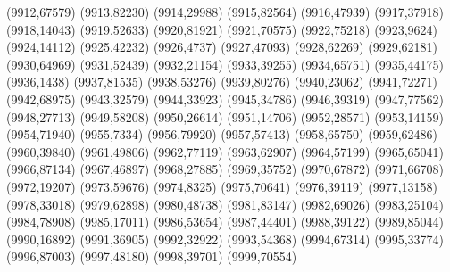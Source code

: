 (9912,67579)
(9913,82230)
(9914,29988)
(9915,82564)
(9916,47939)
(9917,37918)
(9918,14043)
(9919,52633)
(9920,81921)
(9921,70575)
(9922,75218)
(9923,9624)
(9924,14112)
(9925,42232)
(9926,4737)
(9927,47093)
(9928,62269)
(9929,62181)
(9930,64969)
(9931,52439)
(9932,21154)
(9933,39255)
(9934,65751)
(9935,44175)
(9936,1438)
(9937,81535)
(9938,53276)
(9939,80276)
(9940,23062)
(9941,72271)
(9942,68975)
(9943,32579)
(9944,33923)
(9945,34786)
(9946,39319)
(9947,77562)
(9948,27713)
(9949,58208)
(9950,26614)
(9951,14706)
(9952,28571)
(9953,14159)
(9954,71940)
(9955,7334)
(9956,79920)
(9957,57413)
(9958,65750)
(9959,62486)
(9960,39840)
(9961,49806)
(9962,77119)
(9963,62907)
(9964,57199)
(9965,65041)
(9966,87134)
(9967,46897)
(9968,27885)
(9969,35752)
(9970,67872)
(9971,66708)
(9972,19207)
(9973,59676)
(9974,8325)
(9975,70641)
(9976,39119)
(9977,13158)
(9978,33018)
(9979,62898)
(9980,48738)
(9981,83147)
(9982,69026)
(9983,25104)
(9984,78908)
(9985,17011)
(9986,53654)
(9987,44401)
(9988,39122)
(9989,85044)
(9990,16892)
(9991,36905)
(9992,32922)
(9993,54368)
(9994,67314)
(9995,33774)
(9996,87003)
(9997,48180)
(9998,39701)
(9999,70554)
